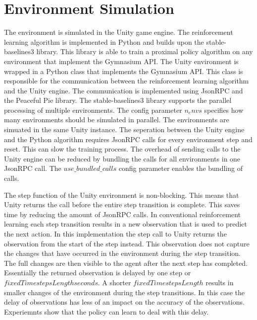 
\section{Environment Simulation}
\label{sec:env_simulation}

The environment is simulated in the Unity game engine. The reinforcement learning algorithm is implemented in Python and builds upon the stable-baselines3 library. This library is able to train a proximal policy algorithm on any environment that implement the Gymnasium API. The Unity environment is wrapped in a Python class that implements the Gymnasium API. This class is responsible for the communication between the reinforcement learning algorithm and the Unity engine. The communication is implemented using JsonRPC and the Peaceful Pie \autocite{peacefulpie} library. 
The stable-baselines3 library supports the parallel processing of multiple environments. The config parameter $n_envs$ specifies how many environments should be simulated in parallel. The environments are simuated in the same Unity instance. The seperation between the Unity engine and the Python algorithm requires JsonRPC calls for every environment step and reset. This can slow the training process. The overhead of sending calls to the Unity engine can be reduced by bundling the calls for all environments in one JsonRPC call. The $use\_bundled\_calls$ config parameter enables the bundling of calls.

The step function of the Unity environment is non-blocking. This means that Unity returns the call before the entire step transition is complete. This saves time by reducing the amount of JsonRPC calls. In conventional reinforcement learning each step transition results in a new observation that is used to predict the next action. In this implementation the step call to Unity returns the observation from the start of the step instead. This observation does not capture the changes that have occurred in the environment during the step transition. The full changes are then visible to the agent after the next step has completed. Essentially the returned observation is delayed by one step or $fixedTimestepsLength seconds$. A shorter $fixedTimestepsLength$ results in smaller changes of the environment during the step transitions. In this case the delay of observations has less of an impact on the accuracy of the observations.
Experiemnts show that the policy can learn to deal with this delay.

